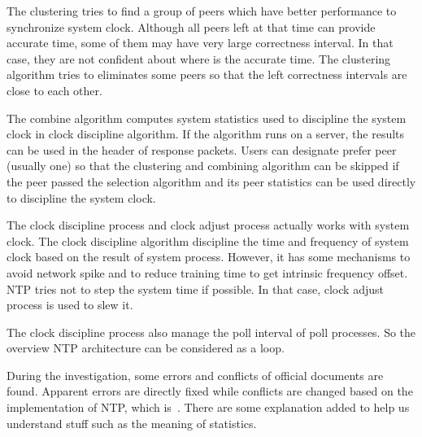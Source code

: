 The clustering tries to find a group of peers which have better performance to
synchronize system clock. Although all peers left at that time can provide
accurate time, some of them may have very large correctness interval. In that
case, they are not confident about where is the accurate time. The clustering
algorithm tries to eliminates some peers so that the left correctness intervals
are close to each other.

The combine algorithm computes system statistics used to discipline the system
clock in clock discipline algorithm. If the algorithm runs on a server, the
results can be used in the header of response packets. Users can designate
prefer peer (usually one) so that the clustering and combining algorithm can be
skipped if the peer passed the selection algorithm and its peer statistics can
be used directly to discipline the system clock.

The clock discipline process and clock adjust process actually works with
system clock. The clock discipline algorithm discipline the time and frequency
of system clock based on the result of system process. However, it has some
mechanisms to avoid network spike and to reduce training time to get intrinsic
frequency offset. NTP tries not to step the system time if possible. In that
case, clock adjust process is used to slew it.

The clock discipline process also manage the poll interval of poll processes.
So the overview NTP architecture can be considered as a loop.

During the investigation, some errors and conflicts of official documents are
found. Apparent errors are directly fixed while conflicts are changed based on
the implementation of NTP, which is~\cite{source_code}. There are some
explanation added to help us understand stuff such as the meaning of
statistics. 

